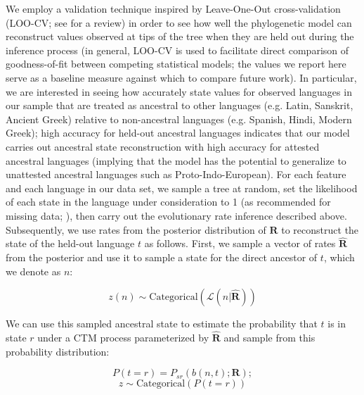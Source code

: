 \documentclass[12pt]{article}
\begin{document}
\begin{appendices}
We employ a validation technique inspired by Leave-One-Out cross-validation (LOO-CV; see \citealt{vehtari2017practical} for a review) in order to see how well the phylogenetic model can reconstruct values observed at tips of the tree when they are held out during the inference process (in general, LOO-CV is used to facilitate direct comparison of goodness-of-fit between competing statistical models; the values we report here serve as a baseline measure against which to compare future work). 
In particular, we are interested in seeing how accurately state values for observed languages in our sample that are treated as ancestral to other languages (e.g. Latin, Sanskrit, Ancient Greek) relative to non-ancestral languages (e.g. Spanish, Hindi, Modern Greek); high accuracy for held-out ancestral languages indicates that our model carries out ancestral state reconstruction with high accuracy for attested ancestral languages (implying that the model has the potential to generalize to unattested ancestral languages such as Proto-Indo-European). For each feature and each language in our data set, we sample a tree at random, set the likelihood of each state in the language under consideration to 1 (as recommended for missing data; \citealt[255]{Felsenstein2004}), then carry out the evolutionary rate inference described above. Subsequently, we use rates from the posterior distribution of $\mathbf{R}$ to reconstruct the state of the held-out language $t$ as follows. First, we sample a vector of rates $\hat{\mathbf{R}}$ from the posterior and use it to sample a state for the direct ancestor of $t$, which we denote as $n$:

$$
z(n) \sim \text{Categorical}(\mathcal{L}(n|\hat{\mathbf{R}}))
$$

We can use this sampled ancestral state to estimate the probability that $t$ is in state $r$ under a CTM process parameterized by $\hat{\mathbf{R}}$ and sample from this probability distribution:

$$
P(t=r) = P_{sr}(b(n,t);\mathbf{R});
$$
$$
z \sim \text{Categorical}(P(t=r))
$$


\end{appendices}
\end{document}
